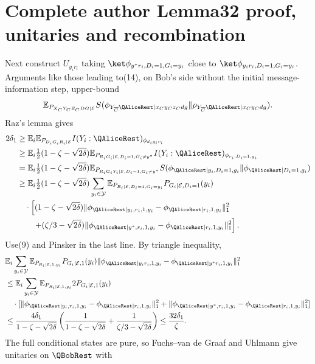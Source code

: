 \section*{Complete author Lemma32 proof, unitaries and recombination}
Next construct $U_{y_ir_i}$ taking $\ket\phi_{y^*r_i,D_i=1,G_i=y_i}$ close to $\ket\phi_{y_ir_i,D_i=1,G_i=y_i}$. Arguments like those leading to(14), on Bob's side without the initial message-information step, upper-bound
\[\mathbb E_{P_{X_CY_CZ_CDG|\mathcal E}}S(\phi_{Y_{\overline C}\QAliceRest|x_Cy_Cz_Cdg}\|\rho_{Y_{\overline C}\QAliceRest|x_Cy_Cdg}).\]
Raz's lemma gives
\begin{align*}2\delta_1&\ge\mathbb E_i\mathbb E_{P_{D_iG_iR_i|\mathcal E}}I(Y_i:\QAliceRest)_{\phi_{d_ig_ir_i}}\\&\ge\mathbb E_i\tfrac12(1-\zeta-\sqrt{2\delta})\mathbb E_{P_{R_iG_i|\mathcal E,D_i=1,G_i\ne y^*}}I(Y_i:\QAliceRest)_{\phi_{r_i,D_i=1,g_i}}\\&=\mathbb E_i\tfrac12(1-\zeta-\sqrt{2\delta})\mathbb E_{P_{R_iG_iY_i|\mathcal E,D_i=1,G_i\ne y^*}}S(\phi_{\QAliceRest|y_i,D_i=1,g_i}\|\phi_{\QAliceRest|D_i=1,g_i})\\&\ge\mathbb E_i\tfrac12(1-\zeta-\sqrt{2\delta})\sum_{y_i\in\mathcal Y}\mathbb E_{P_{R_i|\mathcal E,D_i=1,G_i=y_i}}P_{G_i|\mathcal E,D_i=1}(y_i)\\&\quad\cdot\left[(1-\zeta-\sqrt{2\delta})\|\phi_{\QAliceRest|y_i,r_i,1,y_i}-\phi_{\QAliceRest|r_i,1,y_i}\|_1^2\right.\\&\qquad\left.+(\zeta/3-\sqrt{2\delta})\|\phi_{\QAliceRest|y^*,r_i,1,y_i}-\phi_{\QAliceRest|r_i,1,y_i}\|_1^2\right].\end{align*}
Use(9) and Pinsker in the last line. By triangle inequality,
\begin{align*}&\mathbb E_i\sum_{y_i\in\mathcal Y}\mathbb E_{P_{R_i|\mathcal E,1,y_i}}P_{G_i|\mathcal E,1}(y_i)\|\phi_{\QAliceRest|y_ir_i,1,y_i}-\phi_{\QAliceRest|y^*r_i,1,y_i}\|_1^2\\&\le\mathbb E_i\sum_{y_i\in\mathcal Y}\mathbb E_{P_{R_i|\mathcal E,1,y_i}}2P_{G_i|\mathcal E,1}(y_i)\\&\quad\cdot[\|\phi_{\QAliceRest|y_i,r_i,1,y_i}-\phi_{\QAliceRest|r_i,1,y_i}\|_1^2+\|\phi_{\QAliceRest|y^*,r_i,1,y_i}-\phi_{\QAliceRest|r_i,1,y_i}\|_1^2]\\&\le\frac{4\delta_1}{1-\zeta-\sqrt{2\delta}}\left(\frac1{1-\zeta-\sqrt{2\delta}}+\frac1{\zeta/3-\sqrt{2\delta}}\right)\le\frac{32\delta_1}\zeta.
\end{align*}
The full conditional states are pure, so Fuchs--van de Graaf and Uhlmann give unitaries on $\QBobRest$ with
